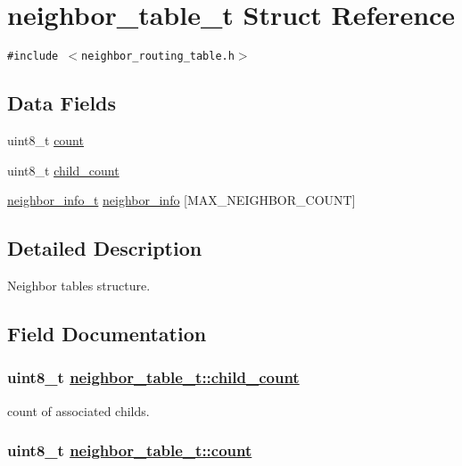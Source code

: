 \hypertarget{structneighbor__table__t}{
\section{neighbor\_\-table\_\-t Struct Reference}
\label{structneighbor__table__t}
}
{\tt \#include $<$neighbor\_\-routing\_\-table.h$>$}

\subsection*{Data Fields}
\begin{CompactItemize}
\item 
uint8\_\-t \hyperlink{structneighbor__table__t_df94b2319ff72b7c0a8d51896484c86e}{count}
\item 
uint8\_\-t \hyperlink{structneighbor__table__t_f293c0c542406d688c883bdbddc130df}{child\_\-count}
\item 
\hyperlink{structneighbor__info__t}{neighbor\_\-info\_\-t} \hyperlink{structneighbor__table__t_e30e42768188549dd78db7e22b26e702}{neighbor\_\-info} \mbox{[}MAX\_\-NEIGHBOR\_\-COUNT\mbox{]}
\end{CompactItemize}


\subsection{Detailed Description}
Neighbor tables structure. 



\subsection{Field Documentation}
\hypertarget{structneighbor__table__t_f293c0c542406d688c883bdbddc130df}{
\subsubsection[child\_\-count]{\setlength{\rightskip}{0pt plus 5cm}uint8\_\-t \hyperlink{structneighbor__table__t_f293c0c542406d688c883bdbddc130df}{neighbor\_\-table\_\-t::child\_\-count}}}
\label{structneighbor__table__t_f293c0c542406d688c883bdbddc130df}


count of associated childs. \hypertarget{structneighbor__table__t_df94b2319ff72b7c0a8d51896484c86e}{
\subsubsection[count]{\setlength{\rightskip}{0pt plus 5cm}uint8\_\-t \hyperlink{structneighbor__table__t_df94b2319ff72b7c0a8d51896484c86e}{neighbor\_\-table\_\-t::count}}}
\label{structneighbor__table__t_df94b2319ff72b7c0a8d51896484c86e}


